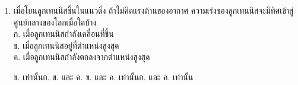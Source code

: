 \begin{enumerate}
\item \runningj {} เมื่อโยนลูกเทนนิสขึ้นในแนวดิ่ง  ถ้าไม่คิดแรงต้านของอากาศ  ความเร่งของลูกเทนนิสจะมีทิศเข้าสู่ศูนย์กลางของโลกเมื่อใดบ้าง \\
	ก. เมื่อลูกเทนนิสกำลังเคลื่อนที่ขึ้น \\
	ข. เมื่อลูกเทนนิสอยู่ที่ตำแหน่งสูงสุด \\
	ค. เมื่อลูกเทนนิสกำลังตกลงจากตำแหน่งสูงสุด 
	\begin{2c}
		{ข.  เท่านั้น}{ก.   ข.  และ  ค.}
		{ข.  และ  ค.  เท่านั้น}{ก.  และ  ค.  เท่านั้น}
	\end{2c}
\end{enumerate}
